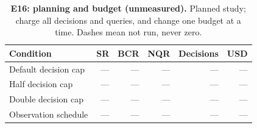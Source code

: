 \begin{table}[!ht]
\centering\small
\caption{\textbf{E16: planning and budget (unmeasured).} Planned study; charge all decisions and queries, and change one budget at a time. Dashes mean not run, never zero.}
\begin{tabularx}{\textwidth}{@{}Xrrrrr@{}}\toprule
Condition & SR & BCR & NQR & Decisions & USD\\\midrule
Default decision cap & --- & --- & --- & --- & ---\\
Half decision cap & --- & --- & --- & --- & ---\\
Double decision cap & --- & --- & --- & --- & ---\\
Observation schedule & --- & --- & --- & --- & ---\\
\bottomrule
\end{tabularx}
\end{table}
